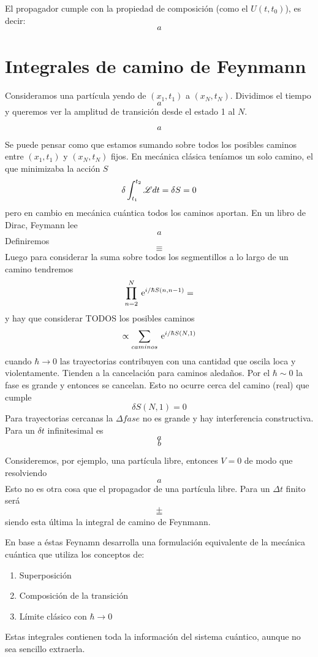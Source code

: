 \documentclass[10pt,oneside]{CBFT_book}
\begin{document}
El propagador cumple con la propiedad de composición (como el $U(t,t_0)$), es decir:
\[
	a
\]

\section{Integrales de camino de Feynmann}

Consideramos una partícula yendo de $(x_1,t_1)$ a $(x_N,t_N)$. Dividimos el tiempo 
\[
	a
\]
y queremos ver la amplitud de transición desde el estado 1 al $N$.

\[
	a
\]

Se puede pensar como que estamos sumando sobre todos los posibles caminos entre $(x_1,t_1)$ y $(x_N,t_N)$ 
fijos. En mecánica clásica teníamos un solo camino, el que minimizaba la acción $S$
\[
	\delta \int_{t_1}^{t_2} \mathscr{L} dt = \delta S = 0
\]
pero en cambio en mecánica cuántica todos los caminos aportan. En un libro de Dirac, Feymann lee 
\[
	a
\]
Definiremos
\[
	\equiv 
\]
Luego para considerar la suma sobre todos los segmentillos a lo largo de un camino tendremos
\[
	\prod_{n=2}^N \:\mathrm{e}^{i/\hbar S(n,n-1)} =
\]
y hay que considerar TODOS los posibles caminos 
\[
	\propto \sum_{caminos} \:\mathrm{e}^{i/\hbar S(N,1)} 
\]
cuando $\hbar \to 0$ las trayectorias contribuyen con una cantidad que oscila loca y violentamente. Tienden a 
la cancelación para caminos aledaños. Por el $\hbar \sim 0$ la fase es grande y entonces se cancelan.
Esto no ocurre cerca del camino (real) que cumple 
\[
	\delta S(N,1) = 0
\]
Para trayectorias cercanas la $\Delta fase$ no es grande y hay interferencia constructiva.
Para un $\delta t$ infinitesimal es 
\[
	a
\]
\[
	b
\]

Consideremos, por ejemplo, una partícula libre, entonces $V=0$ de modo que resolviendo 
\[
	a
\]
Esto no es otra cosa que el propagador de una partícula libre. Para un $\Delta t$ finito será 
\[
	+
\]
\[
	=
\]
siendo esta última la integral de camino de Feynmann.

En base a éstas Feynamn desarrolla una formulación equivalente de la mecánica cuántica que utiliza los 
conceptos de:
\begin{enumerate}
 \item Superposición
 \item Composición de la transición
 \item Límite clásico con $\hbar \to 0$
\end{enumerate}

Estas integrales contienen toda la información del sistema cuántico, aunque no sea sencillo extraerla.
\end{document}
